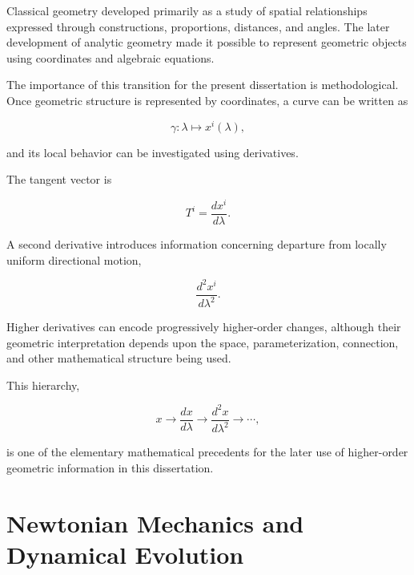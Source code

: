 \documentclass[12pt,oneside]{book}
\begin{document}
Classical geometry developed primarily as a study of spatial
relationships expressed through constructions, proportions,
distances, and angles. The later development of analytic
geometry made it possible to represent geometric objects using
coordinates and algebraic equations.

The importance of this transition for the present dissertation
is methodological. Once geometric structure is represented by
coordinates, a curve can be written as

\begin{equation}
    \gamma:
    \lambda
    \longmapsto
    x^i(\lambda),
    \label{eq:parametric-curve-history}
\end{equation}

and its local behavior can be investigated using derivatives.

The tangent vector is

\begin{equation}
    T^i
    =
    \frac{dx^i}{d\lambda}.
    \label{eq:historical-tangent}
\end{equation}

A second derivative introduces information concerning departure
from locally uniform directional motion,

\begin{equation}
    \frac{d^2x^i}{d\lambda^2}.
    \label{eq:historical-second-derivative}
\end{equation}

Higher derivatives can encode progressively higher-order
changes, although their geometric interpretation depends upon
the space, parameterization, connection, and other mathematical
structure being used.

This hierarchy,

\begin{equation}
    x
    \rightarrow
    \frac{dx}{d\lambda}
    \rightarrow
    \frac{d^2x}{d\lambda^2}
    \rightarrow
    \cdots,
    \label{eq:derivative-hierarchy}
\end{equation}

is one of the elementary mathematical precedents for the later
use of higher-order geometric information in this dissertation.


\section{Newtonian Mechanics and Dynamical Evolution}
\label{sec:newtonian-mechanics}
\end{document}
